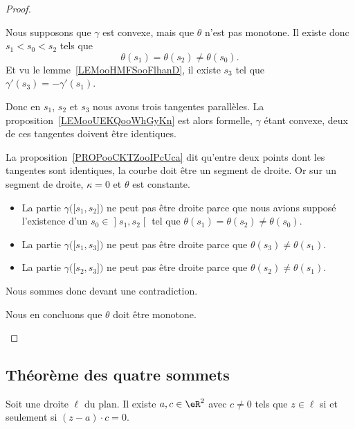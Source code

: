 \begin{proof}
\begin{subproof}
		Nous supposons que \( \gamma\) est convexe, mais que \( \theta\) n'est pas monotone. Il existe donc \( s_1<s_0<s_2\) tels que
		\begin{equation}
			\theta(s_1)=\theta(s_2)\neq \theta(s_0).
		\end{equation}
		Et vu le lemme~\ref{LEMooHMFSooFlhanD}, il existe \( s_3\) tel que \( \gamma'(s_3)=-\gamma'(s_1)\).

		Donc en \( s_1\), \( s_2\) et \( s_3\) nous avons trois tangentes parallèles. La proposition~\ref{LEMooUEKQooWhGyKn} est alors formelle, \( \gamma\) étant convexe, deux de ces tangentes doivent être identiques.

		La proposition~\ref{PROPooCKTZooIPcUca} dit qu'entre deux points dont les tangentes sont identiques, la courbe doit être un segment de droite. Or sur un segment de droite, \( \kappa=0\) et \( \theta\) est constante.

		\begin{itemize}
			\item
			      La partie \( \gamma\big( \mathopen[ s_1 , s_2 \mathclose] \big)\) ne peut pas être droite parce que nous avions supposé l'existence d'un \( s_0\in \mathopen] s_1 , s_2 \mathclose[\) tel que \( \theta(s_1)=\theta(s_2)\neq \theta(s_0)\).

			\item
			      La partie \( \gamma\big( \mathopen[ s_1 , s_3 \mathclose] \big)\) ne peut pas être droite parce que \( \theta(s_3)\neq \theta(s_1)\).
			\item
			      La partie \( \gamma\big( \mathopen[ s_2 , s_3 \mathclose] \big)\) ne peut pas être droite parce que \( \theta(s_2)\neq \theta(s_1)\).
		\end{itemize}
		Nous sommes donc devant une contradiction.

		Nous en concluons que \( \theta\) doit être monotone.
	\end{subproof}
\end{proof}

\subsection{Théorème des quatre sommets}

\begin{lemma}       \label{LEMooELIRooNDVXPh}
	Soit une droite \( \ell\) du plan. Il existe \( a,c\in \eR^2\) avec \( c\neq 0\) tels que \( z\in \ell\) si et seulement si \( (z-a)\cdot c=0\).
\end{lemma}

